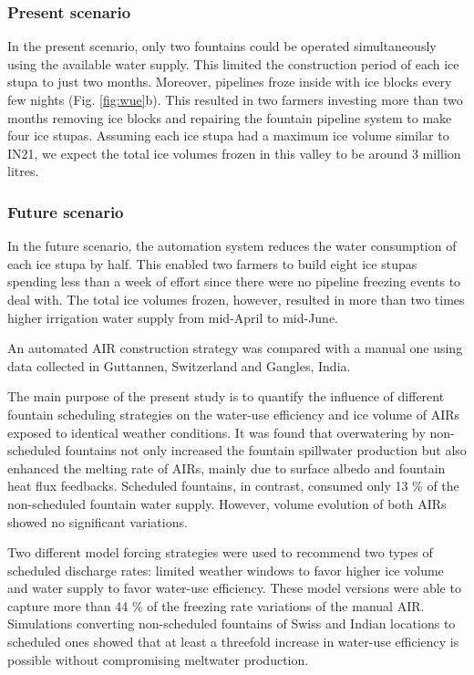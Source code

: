 \documentclass[tc, manuscript]{copernicus}
\begin{document}
\subsubsection{Present scenario}

In the present scenario, only two fountains could be operated simultaneously using the available water
supply. This limited the construction period of each ice stupa to just two months. Moreover, pipelines froze
inside with ice blocks every few nights (Fig. \ref{fig:wue}b). This resulted in two farmers investing more than
two months removing ice blocks and repairing the fountain pipeline system to make four ice stupas. Assuming each
ice stupa had a maximum ice volume similar to IN21, we expect the total ice volumes frozen in this valley to be
around 3 million litres.   

\subsubsection{Future scenario}

In the future scenario, the automation system reduces the water consumption of each ice stupa by half. This
enabled two farmers to build eight ice stupas spending less than a week of effort since there were no pipeline
freezing events to deal with. The total ice volumes frozen, however, resulted in more than two times higher
irrigation water supply from mid-April to mid-June.

\conclusions

An automated AIR construction strategy was compared with a manual one using data collected in Guttannen,
Switzerland and Gangles, India.

The main purpose of the present study is to quantify the influence of different fountain scheduling strategies
on the water-use efficiency and ice volume of AIRs exposed to identical weather conditions. It was found that
overwatering by non-scheduled fountains not only increased the fountain spillwater production but also enhanced
the melting rate of AIRs, mainly due to surface albedo and fountain heat flux feedbacks. Scheduled fountains, in
contrast, consumed only 13 \% of the non-scheduled fountain water supply. However, volume evolution of both AIRs
showed no significant variations. 

Two different model forcing strategies were used to recommend two types of scheduled discharge rates: limited
weather windows to favor higher ice volume and water supply to favor water-use efficiency. These model versions
were able to capture more than 44 \% of the freezing rate variations of the manual AIR. Simulations converting
non-scheduled fountains of Swiss and Indian locations to scheduled ones showed that at least a threefold increase
in water-use efficiency is possible without compromising meltwater production.
\end{document}

